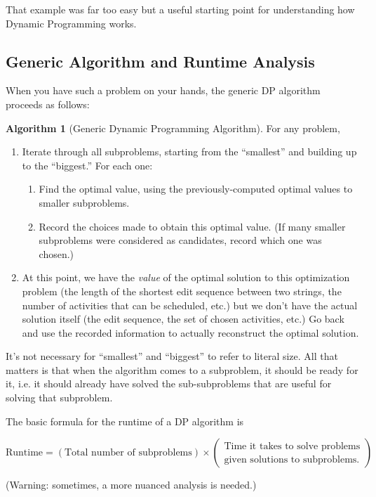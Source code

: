 \documentclass[11pt]{article}
\theoremstyle{plain}
\theoremstyle{definition}
\newtheorem{alg}[thm]{Algorithm}
\numberwithin{equation}{section}
\numberwithin{figure}{section}
\begin{document}
\noindent That example was far too easy but a useful starting point for understanding how Dynamic Programming works. 

\subsection{Generic Algorithm and Runtime Analysis}
When you have such a problem on your hands, the generic DP algorithm proceeds as follows:
\begin{framed}
\begin{alg}[Generic Dynamic Programming Algorithm]
For any problem,
\begin{enumerate}
\item Iterate through all subproblems, starting from the ``smallest'' and building up to the ``biggest.'' For each one:
\begin{enumerate}
\item Find the optimal value, using the previously-computed optimal values to smaller subproblems.
\item Record the choices made to obtain this optimal value. (If many smaller subproblems were considered as candidates, record which one was chosen.)
\end{enumerate}
\item At this point, we have the \emph{value} of the optimal solution to this optimization problem (the length of the shortest edit sequence between two strings, the number of activities that can be scheduled, etc.) but we don't have the actual solution itself (the edit sequence, the set of chosen activities, etc.) Go back and use the recorded information to actually reconstruct the optimal solution.
\end{enumerate}
\end{alg}
\end{framed}
\noindent It's not necessary for ``smallest'' and ``biggest'' to refer to literal size. All that matters is that when the algorithm comes to a subproblem, it should be ready for it, i.e. it should already have solved the sub-subproblems that are useful for solving that subproblem.


\noindent The basic formula for the runtime of a DP algorithm is
\begin{framed}
\[
\text{Runtime} = (\text{Total number of subproblems}) \times \left(\begin{array}{c}\text{Time it takes to solve problems} \\ \text{given solutions to subproblems.}\end{array}\right)
\]
\end{framed}
(Warning: sometimes, a more nuanced analysis is needed.)
\end{document}
